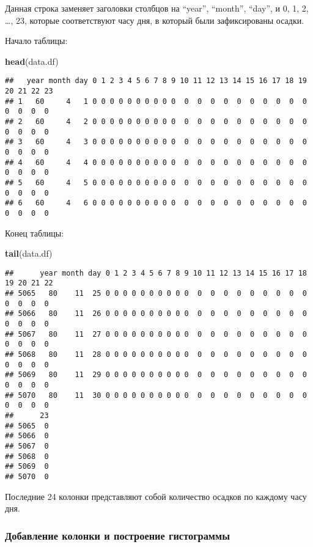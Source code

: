 \documentclass[
]{article}
\newenvironment{Shaded}{\begin{snugshade}}{\end{snugshade}}
\newcommand{\FunctionTok}[1]{\textcolor[rgb]{0.13,0.29,0.53}{\textbf{#1}}}
\newcommand{\NormalTok}[1]{#1}
\begin{document}
Данная строка заменяет заголовки столбцов на ``year'', ``month'',
``day'', и 0, 1, 2, \ldots, 23, которые соответствуют часу дня, в
который были зафиксированы осадки.

Начало таблицы:

\begin{Shaded}
\begin{Highlighting}[]
\FunctionTok{head}\NormalTok{(data.df)}
\end{Highlighting}
\end{Shaded}

\begin{verbatim}
##   year month day 0 1 2 3 4 5 6 7 8 9 10 11 12 13 14 15 16 17 18 19 20 21 22 23
## 1   60     4   1 0 0 0 0 0 0 0 0 0 0  0  0  0  0  0  0  0  0  0  0  0  0  0  0
## 2   60     4   2 0 0 0 0 0 0 0 0 0 0  0  0  0  0  0  0  0  0  0  0  0  0  0  0
## 3   60     4   3 0 0 0 0 0 0 0 0 0 0  0  0  0  0  0  0  0  0  0  0  0  0  0  0
## 4   60     4   4 0 0 0 0 0 0 0 0 0 0  0  0  0  0  0  0  0  0  0  0  0  0  0  0
## 5   60     4   5 0 0 0 0 0 0 0 0 0 0  0  0  0  0  0  0  0  0  0  0  0  0  0  0
## 6   60     4   6 0 0 0 0 0 0 0 0 0 0  0  0  0  0  0  0  0  0  0  0  0  0  0  0
\end{verbatim}

Конец таблицы:

\begin{Shaded}
\begin{Highlighting}[]
\FunctionTok{tail}\NormalTok{(data.df)}
\end{Highlighting}
\end{Shaded}

\begin{verbatim}
##      year month day 0 1 2 3 4 5 6 7 8 9 10 11 12 13 14 15 16 17 18 19 20 21 22
## 5065   80    11  25 0 0 0 0 0 0 0 0 0 0  0  0  0  0  0  0  0  0  0  0  0  0  0
## 5066   80    11  26 0 0 0 0 0 0 0 0 0 0  0  0  0  0  0  0  0  0  0  0  0  0  0
## 5067   80    11  27 0 0 0 0 0 0 0 0 0 0  0  0  0  0  0  0  0  0  0  0  0  0  0
## 5068   80    11  28 0 0 0 0 0 0 0 0 0 0  0  0  0  0  0  0  0  0  0  0  0  0  0
## 5069   80    11  29 0 0 0 0 0 0 0 0 0 0  0  0  0  0  0  0  0  0  0  0  0  0  0
## 5070   80    11  30 0 0 0 0 0 0 0 0 0 0  0  0  0  0  0  0  0  0  0  0  0  0  0
##      23
## 5065  0
## 5066  0
## 5067  0
## 5068  0
## 5069  0
## 5070  0
\end{verbatim}

Последние 24 колонки представляют собой количество осадков по каждому
часу дня.

\subsubsection{Добавление колонки и построение
гистограммы}\label{ux434ux43eux431ux430ux432ux43bux435ux43dux438ux435-ux43aux43eux43bux43eux43dux43aux438-ux438-ux43fux43eux441ux442ux440ux43eux435ux43dux438ux435-ux433ux438ux441ux442ux43eux433ux440ux430ux43cux43cux44b}
\end{document}
